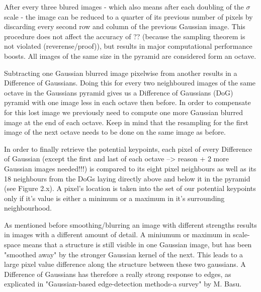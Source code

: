\documentclass{article}
\begin{document}
After every three blured images - which also means after each doubling of the $\sigma$ scale - the image can be reduced to a quarter of its previous number of pixels by discarding every second row and column of the previous Gaussian image. This procedure does not affect the accuracy of ?? (because the sampling theorem is not violated (reverense/proof)), but results in major computational performance boosts. All images of the same size in the pyramid are considered form an octave. 

Subtracting one Gaussian blurred image pixelwise from another results in a Difference of Gaussians. Doing this for every two neighboured images of the same octave in the Gaussians pyramid gives us a Difference of Gaussians (DoG) pyramid with one image less in each octave then before. In order to compensate for this lost image we previously need to compute one more Gaussian blurred image at the end of each octave. Keep in mind that the resampling for the first image of the next octave needs to be done on the same image as before.

In order to finally retrieve the potential keypoints, each pixel of every Difference of Gaussian (except the first and last of each octave --> reason + 2 more Gaussian images needed!!!) is compared to its eight pixel neighbours as well as its 18 neighbours from the DoGs laying directly above and below it in the pyramid (see Figure 2.x). A pixel's location is taken into the set of our potential keypoints only if it's value is either a minimum or a maximum in it's surrounding neighbourhood. 

As mentioned before smoothing/blurring an image with different strengths results in images with a different amount of detail. A miniumum or maximum in scale-space means that a structure is still visible in one Gaussian image, but has been "smoothed away" by the stronger Gaussian kernel of the next. This leads to a large pixel value difference along the structure between these two gaussians. A Difference of Gaussians has therefore a really strong response to edges, as explicated in "Gaussian-based edge-detection methods-a survey" by M. Basu.
\end{document}
